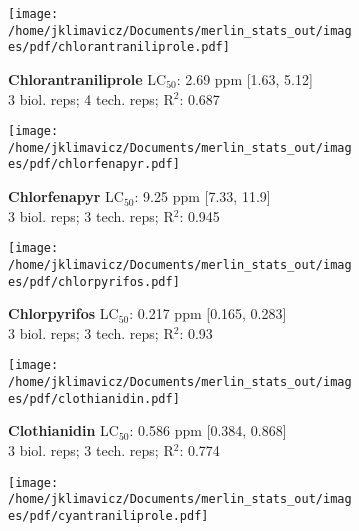 \documentclass{article}
\begin{document}
\begin{figure}[thp!]
   \begin{subfigure}{0.500\textwidth}
      \centering
      \texttt{[image: /home/jklimavicz/Documents/merlin\_stats\_out/images/pdf/chlorantraniliprole.pdf]}
      \vspace{-0.05cm}
      \caption*{\textbf{Chlorantraniliprole} LC$_{50}$: 2.69 ppm [1.63, 5.12] \\ 
3 biol. reps; 4 tech. reps; R$^2$: 0.687}
      \vspace{0.1cm}
   \end{subfigure}%
   \begin{subfigure}{0.500\textwidth}
      \centering
      \texttt{[image: /home/jklimavicz/Documents/merlin\_stats\_out/images/pdf/chlorfenapyr.pdf]}
      \vspace{-0.05cm}
      \caption*{\textbf{Chlorfenapyr} LC$_{50}$: 9.25 ppm [7.33, 11.9] \\ 
3 biol. reps; 3 tech. reps; R$^2$: 0.945}
      \vspace{0.1cm}
   \end{subfigure}%
\vspace{-0.1cm}
   \begin{subfigure}{0.500\textwidth}
      \centering
      \texttt{[image: /home/jklimavicz/Documents/merlin\_stats\_out/images/pdf/chlorpyrifos.pdf]}
      \vspace{-0.05cm}
      \caption*{\textbf{Chlorpyrifos} LC$_{50}$: 0.217 ppm [0.165, 0.283] \\ 
3 biol. reps; 3 tech. reps; R$^2$: 0.93}
      \vspace{0.1cm}
   \end{subfigure}%
   \begin{subfigure}{0.500\textwidth}
      \centering
      \texttt{[image: /home/jklimavicz/Documents/merlin\_stats\_out/images/pdf/clothianidin.pdf]}
      \vspace{-0.05cm}
      \caption*{\textbf{Clothianidin} LC$_{50}$: 0.586 ppm [0.384, 0.868] \\ 
3 biol. reps; 3 tech. reps; R$^2$: 0.774}
      \vspace{0.1cm}
   \end{subfigure}%
\vspace{-0.1cm}
   \begin{subfigure}{0.500\textwidth}
      \centering
      \texttt{[image: /home/jklimavicz/Documents/merlin\_stats\_out/images/pdf/cyantraniliprole.pdf]}

\end{subfigure}
\end{figure}
\end{document}
